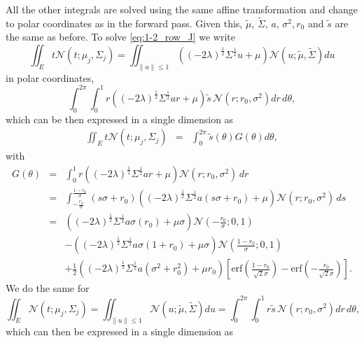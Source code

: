 \documentclass{article}
\begin{document}
All the other integrals are solved using the same affine transformation and change to polar coordinates as in the forward pass. Given this, $\tilde{\mu}$, $\tilde{\Sigma}$, $a$, $\sigma^2, r_0$ and $\tilde{s}$ are the same as before. 
To solve \eqref{eq:1-2_row_J} we write
\begin{equation}
    \iint_{E} t\mathcal{N}(t; \mu_j, \Sigma_j) = \iint_{\|u\|\le 1} \left((-2\lambda)^{\frac{1}{2}} \Sigma^{\frac{1}{2}}u+\mu\right) \mathcal{N}(u; \tilde{\mu}, \tilde{\Sigma}) du
\end{equation}
in polar coordinates,
\begin{equation}
    \int_{0}^{2\pi} \int_{0}^1 
 r\left((-2\lambda)^{\frac{1}{2}} \Sigma^{\frac{1}{2}}ar+\mu\right) \tilde{s} \, \mathcal{N}(r; r_0, \sigma^2) dr \, d\theta,
\end{equation}
which can be then expressed in a single dimension as 
\begin{eqnarray}
\iint_{E} t\mathcal{N}(t; \mu_j, \Sigma_j) &=& \int_{0}^{2\pi} \tilde{s}(\theta) G(\theta)d\theta,
\end{eqnarray}
with
\begin{eqnarray}
 G(\theta) &=& \int_{0}^1 
r\left((-2\lambda)^{\frac{1}{2}} \Sigma^{\frac{1}{2}}ar+\mu\right)  \mathcal{N}(r; r_0, \sigma^2) \, dr \nonumber\\
&=& \int_{-\frac{r_0}{\sigma}}^{\frac{1-r_0}{\sigma}}
(s\sigma+r_0)\left((-2\lambda)^{\frac{1}{2}} \Sigma^{\frac{1}{2}}a(s\sigma+r_0)+\mu\right)  \mathcal{N}(r; r_0, \sigma^2) \, ds \nonumber\\
&=&
\left((-2\lambda)^{\frac{1}{2}} \Sigma^{\frac{1}{2}}a\sigma(r_0)+\mu\sigma\right)\mathcal{N}\left(-\frac{r_0}{\sigma};0,1\right) \nonumber\\
&&-\left((-2\lambda)^{\frac{1}{2}} \Sigma^{\frac{1}{2}}a\sigma(1+r_0)+\mu\sigma\right) \mathcal{N}\left(\frac{1-r_0}{\sigma};0,1\right) \nonumber\\
&&+\frac{1}{2}\left((-2\lambda)^{\frac{1}{2}} \Sigma^{\frac{1}{2}}a(\sigma^2+r_0^2)+\mu r_0\right)\left[ \mathrm{erf}\left(\frac{1-r_0}{\sqrt{2}\sigma}\right)- \mathrm{erf}\left(-\frac{r_0}{\sqrt{2}\sigma}\right)\right]. 
\end{eqnarray}
We do the same for
\begin{equation}
    \iint_{E} \mathcal{N}(t; \mu_j, \Sigma_j)=\iint_{\|u\|\le 1} \mathcal{N}(u; \tilde{\mu}, \tilde{\Sigma}) du =     \int_{0}^{2\pi} \int_{0}^1 
 r\tilde{s} \, \mathcal{N}(r; r_0, \sigma^2) dr \, d\theta,
\end{equation}
which can then be expressed in a single dimension as 
\end{document}
